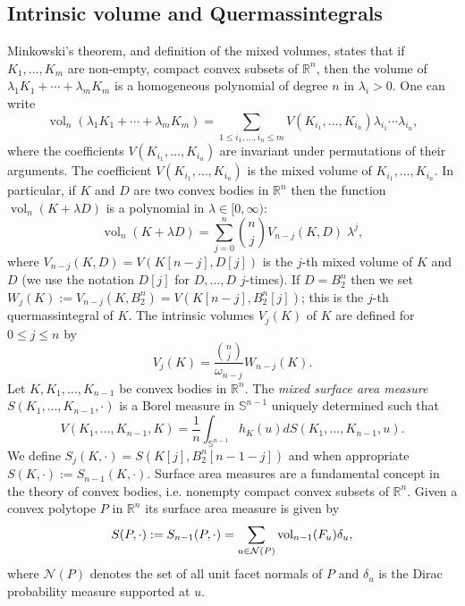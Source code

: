 \documentclass[10pt]{amsart}
\newcommand{\ls}{\leqslant}
\newcommand{\1}{\textbf{1}}
\numberwithin{equation}{section} %
\theoremstyle{remark}
\theoremstyle{definition}
\begin{document}
\subsection{Intrinsic volume and Quermassintegrals}
Minkowski's theorem, and definition of the mixed volumes, states that if $K_1,\ldots ,K_m$ are non-empty, compact convex
subsets of ${\mathbb R}^n$, then the volume of $\lambda_1K_1+\cdots +\lambda_mK_m$ is a homogeneous polynomial of degree $n$ in
$\lambda_i>0$. One can write
\begin{equation*}\operatorname{vol}_n(\lambda_1K_1+\cdots +\lambda_mK_m)=\sum_{1\ls i_1,\ldots ,i_n\ls m}
V(K_{i_1},\ldots ,K_{i_n})\lambda_{i_1}\cdots \lambda_{i_n},
\end{equation*}
where the coefficients $V(K_{i_1},\ldots ,K_{i_n})$ are invariant under permutations of their arguments. The coefficient $V(K_{i_1},\ldots ,K_{i_n})$
is the mixed volume of $K_{i_1},\ldots ,K_{i_n}$. In particular, if $K$ and $D$ are two convex bodies in ${\mathbb R}^n$
then the function $\operatorname{vol}_n(K+\lambda D)$ is a polynomial in $\lambda\in [0,\infty )$:
\begin{equation*}\operatorname{vol}_n(K+\lambda D)=\sum_{j=0}^n \binom{n}{j} V_{n-j}(K,D)\;\lambda^j,\end{equation*}
where $V_{n-j}(K,D)= V(K[n-j],D[j])$ is the $j$-th mixed volume of $K$ and $D$ (we use  the notation $D[j]$ for $D,\ldots ,D$ $j$-times).
If $D=B_2^n$ then we set $W_j(K):=V_{n-j}(K,B_2^n)=V(K[n-j], B_2^n[ j])$; this is the $j$-th quermassintegral of $K$.
The intrinsic volumes $V_j(K)$ of $K$ are defined for $0\ls j\ls n$ by
\begin{equation}\label{eq:intrinsic}V_j(K)=\frac{\binom{n}{j}}{\omega_{n-j}}W_{n-j}(K).\end{equation}
 Let $K,K_1,\ldots,K_{n-1}$ be convex bodies in $\mathbb{R}^{n}$. The \emph{mixed surface area measure} $S(K_1,\ldots,K_{n-1},\cdot)$ is a Borel measure in $\mathbb{S}^{n-1}$ uniquely determined such that 
\[
V(K_1,\ldots,K_{n-1},K)=\frac{1}{n}\int_{\mathbb{S}^{n-1}}h_{K}(u) dS(K_1,\ldots,K_{n-1},u).
\]
We define $S_j(K,\cdot)=S(K[j],B_2^n[n-1-j])$ and when appropriate $S(K,\cdot):=S_{n-1}(K,\cdot)$. Surface area measures are a fundamental concept in the theory of convex bodies, i.e.
nonempty compact convex subsets of $\mathbb{R}^n$. Given  a convex polytope $P$ in $\mathbb{R}^n$  its surface area measure is given by 
\begin{equation}\label{S_{n-1}(P)}
S(P,\cdot):=S_{n-1}(P,\cdot)=\sum_{u\in \mathcal{N}(P)}\operatorname{vol}_{n-1}(F_u)\delta_u,
\end{equation}
where $\mathcal{N}(P)$ denotes the set of all unit facet normals of $P$ and $\delta_u$ is the Dirac probability measure supported at $u$.
\end{document}
